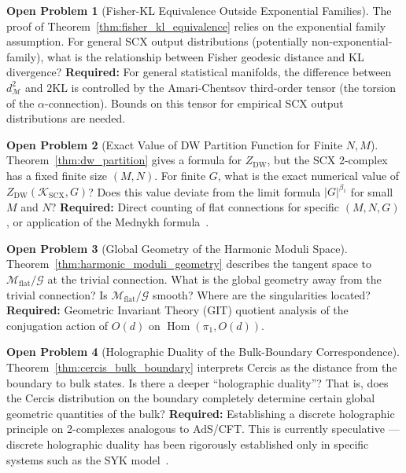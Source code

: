 \documentclass[12pt,a4paper]{article}
\theoremstyle{definition}
\newtheorem{problem}{Open Problem}[section]
\theoremstyle{remark}
\theoremstyle{definition}
\newcommand{\Od}{O(d)}
\newcommand{\KL}{\mathrm{KL}}
\newcommand{\GeoDist}{d_{\mathcal{M}}}
\newcommand{\DW}{\mathrm{DW}}
\newcommand{\ZBetti}{\beta_1}
\newcommand{\Gflatquot}{\mathcal{M}_{\mathrm{flat}}/\mathcal{G}}
\DeclareMathOperator{\Hom}{Hom}
\begin{document}
\begin{problem}[Fisher-KL Equivalence Outside Exponential Families]\label{prob:non_exp_fam}
The proof of Theorem~\ref{thm:fisher_kl_equivalence} relies on the exponential family assumption.
For general SCX output distributions (potentially non-exponential-family), what is the relationship between Fisher geodesic distance and KL divergence?
\textbf{Required:} For general statistical manifolds, the difference between $\GeoDist^2$ and $2\KL$ is controlled by the Amari-Chentsov third-order tensor (the torsion of the $\alpha$-connection).
Bounds on this tensor for empirical SCX output distributions are needed.
\end{problem}

\begin{problem}[Exact Value of DW Partition Function for Finite $N, M$]\label{prob:dw_finite}
Theorem~\ref{thm:dw_partition} gives a formula for $Z_{\DW}$, but the SCX 2-complex has a fixed finite size $(M, N)$.
For finite $G$, what is the exact numerical value of $Z_{\DW}(\mathcal{K}_{\text{SCX}}, G)$?
Does this value deviate from the limit formula $|G|^{\ZBetti}$ for small $M$ and $N$?
\textbf{Required:} Direct counting of flat connections for specific $(M, N, G)$, or application of the Mednykh formula~\cite{mednykh}.
\end{problem}

\begin{problem}[Global Geometry of the Harmonic Moduli Space]\label{prob:global_moduli}
Theorem~\ref{thm:harmonic_moduli_geometry} describes the tangent space to $\Gflatquot$ at the trivial connection.
What is the global geometry away from the trivial connection? Is $\Gflatquot$ smooth? Where are the singularities located?
\textbf{Required:} Geometric Invariant Theory (GIT) quotient analysis of the conjugation action of $\Od$ on $\Hom(\pi_1, \Od)$.
\end{problem}

\begin{problem}[Holographic Duality of the Bulk-Boundary Correspondence]\label{prob:holographic}
Theorem~\ref{thm:cercis_bulk_boundary} interprets Cercis as the distance from the boundary to bulk states.
Is there a deeper ``holographic duality''?
That is, does the Cercis distribution on the boundary completely determine certain global geometric quantities of the bulk?
\textbf{Required:} Establishing a discrete holographic principle on 2-complexes analogous to AdS/CFT.
This is currently speculative — discrete holographic duality has been rigorously established only in specific systems such as the SYK model~\cite{sachdev2010}.
\end{problem}
\end{document}
